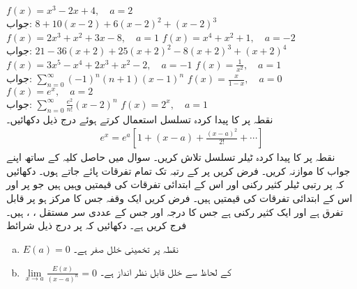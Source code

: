 $f(x)=x^3-2x+4,\quad a=2$\\
جواب:\quad
$8+10(x-2)+6(x-2)^2+(x-2)^3$
$f(x)=2x^3+x^2+3x-8,\quad a=1$
$f(x)=x^4+x^2+1,\quad a=-2$\\
جواب:\quad
$21-36(x+2)+25(x+2)^2-8(x+2)^3+(x+2)^4$
$f(x)=3x^5-x^4+2x^3+x^2-2,\quad a=-1$
$f(x)=\frac{1}{x^2},\quad a=1$\\
جواب:\quad
$\sum\limits_{n=0}^{\infty}(-1)^n(n+1)(x-1)^n$
$f(x)=\frac{x}{1-x},\quad a=0$
$f(x)=e^x,\quad a=2$\\
جواب:\quad
$\sum\limits_{n=0}^{\infty}\tfrac{e^2}{n!}(x-2)^n$
$f(x)=2^x,\quad a=1$
\\
نقطہ  پر  کا پیدا کردہ تسلسل استعمال کرتے ہوئے درج ذیل دکھائیں۔
\begin{align*} 
e^x=e^a[1+(x-a)+\frac{(x-a)^2}{2!}+\cdots]
\end{align*}
نقطہ  پر  کا پیدا کردہ ٹیلر تسلسل تلاش کریں۔  سوال   میں حاصل کلیہ کے ساتھ اپنے جواب کا موازنہ کریں۔
فرض کریں  پر  کے  رتبہ تک تمام تفرقات پائے جاتے ہوں۔ دکھائیں کہ  پر  رتبی ٹیلر کثیر رکنی اور اس کے ابتدائی  تفرقات کی قیمتیں وہیں ہیں جو  پر  اور اس کے ابتدائی  تفرقات کی قیمتیں ہیں۔ 
 فرض کریں  ایک وقفہ  جس کا مرکز  ہو پر قابل تفرق ہے اور  ایک کثیر رکنی ہے جس کا درجہ   اور جس کے عددی سر مستقل ، ،  ہیں۔فرج کریں  ہے۔ دکھائیں کہ  پر درج ذیل شرائط
\begin{enumerate}[a.]
\item
$E(a)=0$\quad\quad
نقطہ  پر تخمینی خلل صفر ہے۔
\item
$\lim\limits_{x\to a}\frac{E(x)}{(x-a)^n}=0$\quad\quad
{} کے لحاظ سے خلل قابل نظر انداز ہے۔
\end{enumerate}
